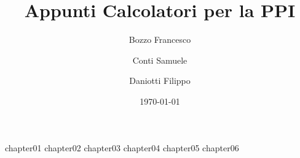\documentclass[a4paper,12pt, oneside]{book}
\author{Bozzo Francesco \and Conti Samuele \and Daniotti Filippo}
\title{Appunti Calcolatori per la PPI}
\date{\today}
\begin{document}
	\frontmatter
	\maketitle
	\tableofcontents

	\mainmatter

	{chapter01}
	{chapter02}
	{chapter03}
	{chapter04}
	{chapter05}
	{chapter06}

	\backmatter
\end{document}
